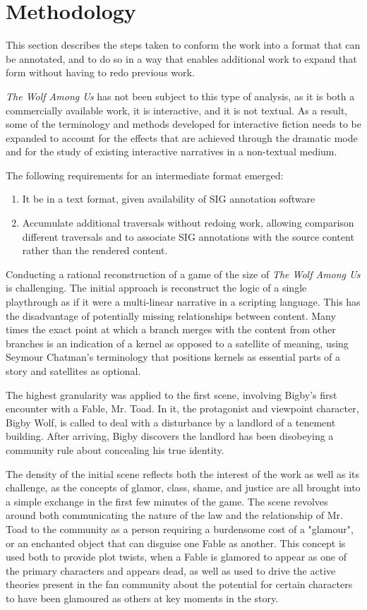 \section{Methodology}
\label{sec:orgheadline5}
This section describes the steps taken to conform the work into a
format that can be annotated, and to do so in a way that enables
additional work to expand that form without having to redo previous
work. 

\emph{The Wolf Among Us} has not been subject to this type of analysis, as
it is both a commercially available work, it is interactive, and it is
not textual. As a result, some of the terminology and methods
developed for interactive fiction needs to be expanded to account for
the effects that are achieved through the dramatic mode and for the
study of existing interactive narratives in a non-textual medium.

The following requirements for an intermediate format emerged:
\begin{enumerate}
\item It be in a text format, given availability of SIG annotation software
\item Accumulate additional traversals without redoing work, allowing
comparison different traversals and to associate SIG annotations
with the source content rather than the rendered content.
\end{enumerate}

Conducting a rational reconstruction of a game of the size of \emph{The
Wolf Among Us} is challenging. The initial approach is reconstruct the
logic of a single playthrough as if it were a multi-linear
narrative in a scripting language. This has the disadvantage of potentially missing
relationships between content. Many times the exact point at which a
branch merges with the content from other branches is an indication of
a kernel as opposed to a satellite of meaning, using Seymour Chatman's
terminology that positions kernels as essential parts of a story and
satellites as optional\cite{Chatman1980}.

The highest granularity was applied to the first scene, involving
Bigby's first encounter with a Fable, Mr. Toad. In it, the protagonist
and viewpoint character, Bigby Wolf, is called to deal with a
disturbance by a landlord of a tenement building. After arriving,
Bigby discovers the landlord has been disobeying a community rule
about concealing his true identity. 

The density of the initial scene reflects both the interest of the
work as well as its challenge, as the concepts of glamor, class,
shame, and justice are all brought into a simple exchange in the first
few minutes of the game. The scene revolves around both communicating
the nature of the law and the relationship of Mr. Toad to the
community as a person requiring a burdensome cost of a "glamour", or
an enchanted object that can disguise one Fable as another. This
concept is used both to provide plot twists, when a Fable is glamored
to appear as one of the primary characters and appears dead, as well
as used to drive the active theories present in the fan community
about the potential for certain characters to have been glamoured as
others at key moments in the story. 

